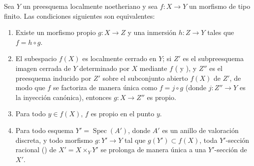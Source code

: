 \begin{corollary}[15.7.6]
\label{IV.15.7.6}
Sea $Y$ un preesquema localmente noetheriano y sea $f:X\to Y$ un morfismo de tipo finito.
Las condiciones siguientes son equivalentes:
\begin{enumerate}[label=\emph{\alph*)}]
  \item Existe un morfismo propio $g:X\to Z$ y una inmersión $h:Z\to Y$ tales que $f=h\circ g$.
  \item El subespacio $f(X)$ es localmente cerrado en $Y$; si $Z'$ es el subpreesquema imagen cerrada de $Y$ determinado por $X$ mediante $f$ \textup{( y )}, y $Z''$ es el preesquema inducido por $Z'$ sobre el subconjunto abierto $f(X)$ de $Z'$, de modo que $f$ se factoriza de manera única como $f=j\circ g$ (donde $j:Z''\to Y$ es la inyección canónica), entonces $g:X\to Z''$ es propio.
  \item Para todo $y\in f(X)$, $f$ es propio en el punto $y$.
  \item Para todo esquema $Y'=\operatorname{Spec}(A')$, donde $A'$ es un anillo de valoración discreta, y todo morfismo $g:Y'\to Y$ tal que $g(Y')\subset f(X)$, toda $Y'$-sección racional \textup{()} de $X'=X\times_Y Y'$ se prolonga de manera única a una $Y'$-sección de $X'$.
\end{enumerate}
\end{corollary}

